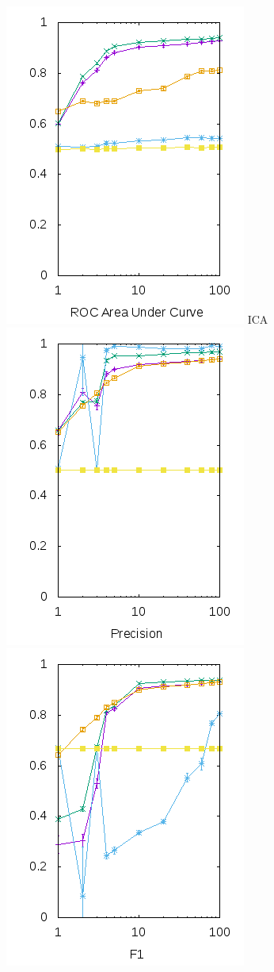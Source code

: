 \documentclass[10pt, a4paper]{article}
\begin{document}
\begin{figure}[H]
\begin{minipage}{1\textwidth}
	\includegraphics[scale=0.5]{../src/data/ropca.png}
  \center ICA\\
	\includegraphics[scale=0.5]{../src/data/prica.png}
	\includegraphics[scale=0.5]{../src/data/f1ica.png}

\end{minipage}
\end{figure}
\end{document}
